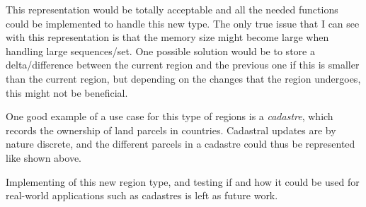 This representation would be totally acceptable and all the needed functions could be implemented to handle this new type. The only true issue that I can see with this representation is that the memory size might become large when handling large sequences/set. One possible solution would be to store a delta/difference between the current region and the previous one if this is smaller than the current region, but depending on the changes that the region undergoes, this might not be beneficial.

One good example of a use case for this type of regions is a \textit{cadastre}, which records the ownership of land parcels in countries. Cadastral updates are by nature discrete, and the different parcels in a cadastre could thus be represented like shown above.

Implementing of this new region type, and testing if and how it could be used for real-world applications such as cadastres is left as future work.

